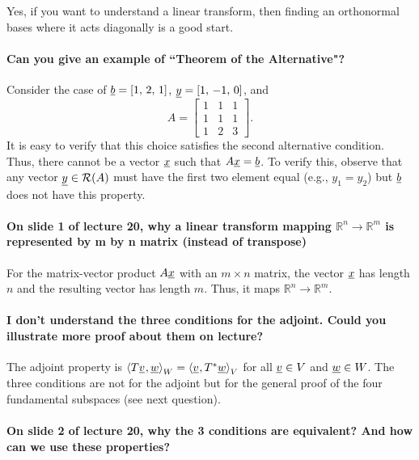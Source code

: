 \documentclass[10pt,english]{article}
\begin{document}
Yes, if you want to understand a linear transform, then finding an orthonormal bases where it acts diagonally is a good start.

\paragraph{Can you give an example of “Theorem of the Alternative"?}

Consider the case of $\underline{b} = [1,\,2,\,1]$, $\underline{y} = [1,\,-1,\,0]$, and
\[ A = \begin{bmatrix} 1 & 1 & 1 \\ 1 & 1 & 1 \\ 1 & 2 & 3 \end{bmatrix}. \]
It is easy to verify that this choice satisfies the second alternative condition.
Thus, there cannot be a vector $\underline{x}$ such that $A \underline{x} = \underline{b}$.
To verify this, observe that any vector $\underline{y} \in \mathcal{R}(A)$ must have the first two element equal (e.g., $y_1 = y_2$) but $\underline{b}$ does not have this property.


\paragraph{On slide 1 of lecture 20, why a linear transform mapping $\mathbb{R}^n \to \mathbb{R}^m$ is represented by m by n matrix (instead of transpose)}

For the matrix-vector product $A \underline{x}$ with an $m \times n$ matrix, the vector $\underline{x}$ has length $n$ and the resulting vector has length $m$.
Thus, it maps $\mathbb{R}^n \to \mathbb{R}^m$.

\paragraph{I don't understand the three conditions for the adjoint.  Could you illustrate more proof about them on lecture?}

The adjoint property is ${\langle  T \underline{v}  \mskip1mu ,  \underline{w}  \rangle}_W = {\langle  \underline{v}  \mskip1mu ,  T^* \underline{w}  \rangle}_V$ for all $\underline{v} \in V$ and $\underline{w} \in W$.
The three conditions are not for the adjoint but for the general proof of the four fundamental subspaces (see next question).

 
\paragraph{On slide 2 of lecture 20, why the 3 conditions are equivalent? And how can we use these properties?}
\end{document}
